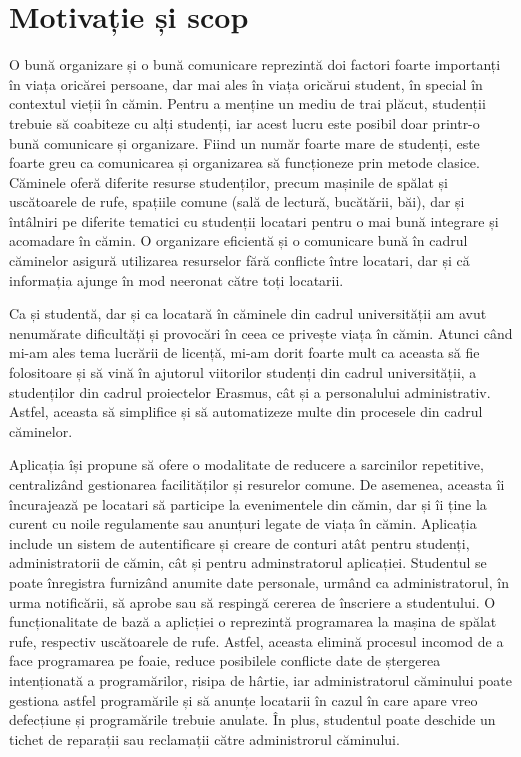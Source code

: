\documentclass[12pt,a4paper]{report}
\theoremstyle{definition}
\theoremstyle{remark}
\begin{document}
\section{Motivație și scop}
\par O bună organizare și o bună comunicare reprezintă doi factori foarte importanți în viața oricărei persoane, dar mai ales în viața oricărui student, în special în contextul vieții în cămin. Pentru a menține un mediu de trai plăcut, studenții trebuie să coabiteze cu alți studenți, iar acest lucru este posibil doar printr-o bună comunicare și organizare. Fiind un număr foarte mare de studenți, este foarte greu ca comunicarea și organizarea să funcționeze prin metode clasice. Căminele oferă diferite resurse studenților, precum mașinile de spălat și uscătoarele de rufe, spațiile comune (sală de lectură, bucătării, băi), dar și întâlniri pe diferite tematici cu studenții locatari pentru o mai bună integrare și acomadare în cămin. O organizare eficientă și o comunicare bună în cadrul căminelor asigură  utilizarea resurselor fără conflicte între locatari, dar și că informația ajunge în mod neeronat către toți locatarii.

\par Ca și studentă, dar și ca locatară în căminele din cadrul universității am avut nenumărate dificultăți și provocări în ceea ce privește viața în cămin. Atunci când mi-am ales tema lucrării de licență, mi-am dorit foarte mult ca aceasta să fie folositoare și să vină în ajutorul viitorilor studenți din cadrul universității, a studenților din cadrul proiectelor Erasmus, cât și a personalului administrativ. Astfel, aceasta să simplifice și să automatizeze multe din procesele din cadrul căminelor.

\par Aplicația își propune să ofere o modalitate de reducere a sarcinilor repetitive, centralizând gestionarea facilităților și resurelor comune. De asemenea, aceasta  îi încurajează pe locatari  să participe la evenimentele din cămin, dar și îi ține la curent cu noile regulamente sau anunțuri legate de viața în cămin. Aplicația include un sistem de autentificare și creare de conturi atât pentru studenți, administratorii de cămin, cât și pentru adminstratorul aplicației. Studentul se poate înregistra furnizând anumite date personale, urmând ca administratorul, în urma notificării, să aprobe sau să respingă cererea de înscriere a studentului. O funcționalitate de bază a aplicției o reprezintă programarea la mașina de spălat rufe, respectiv uscătoarele de rufe. Astfel, aceasta elimină procesul incomod de a face programarea pe foaie, reduce posibilele conflicte date de ștergerea intenționată a programărilor, risipa de hârtie, iar administratorul căminului poate gestiona astfel programările și să anunțe locatarii în cazul în care apare vreo defecțiune și programările trebuie anulate. În plus, studentul poate deschide un tichet de reparații sau reclamații către administrorul căminului.
\end{document}
